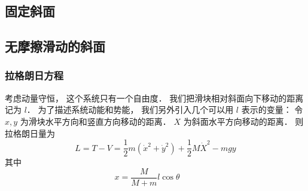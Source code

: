 
\subsection{固定斜面}

\subsection{无摩擦滑动的斜面}

\subsubsection{拉格朗日方程}
考虑动量守恒， 这个系统只有一个自由度． 我们把滑块相对斜面向下移动的距离记为 $l$． 为了描述系统动能和势能， 我们另外引入几个可以用 $l$ 表示的变量： 令 $x, y$ 为滑块水平方向和竖直方向移动的距离． $X$ 为斜面水平方向移动的距离． 则拉格朗日量为
\begin{equation}
L = T - V = \frac12 m(\dot x^2 + \dot y^2) + \frac12 M \dot X^2 - mgy
\end{equation}
其中
\begin{equation}
x = \frac{M}{M + m}l\cos\theta
\qquad
\end{equation}
